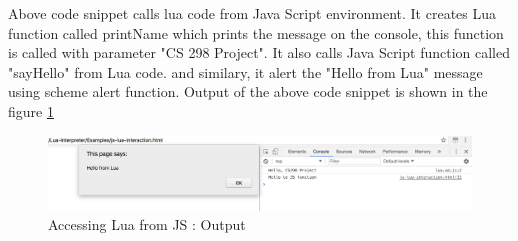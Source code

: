 Above code snippet calls lua code from Java Script environment. It creates Lua function called printName which prints the message on the console, this function is called with parameter "CS 298 Project". It also calls Java Script function called "sayHello" from Lua code. and similary, it alert the "Hello from Lua" message using scheme alert function. Output of the above code snippet is shown in the figure \ref{fig:js-to-lua-interaction}

\begin{figure}[H]
	\begin{center}
		\includegraphics[width=\linewidth]{./images/js-to-lua-interaction.png}
	\end{center}
	\caption{Accessing Lua from JS : Output}
	\label{fig:js-to-lua-interaction}
\end{figure}



